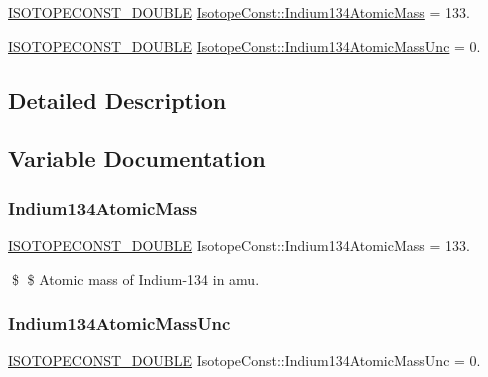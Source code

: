\begin{DoxyCompactItemize}
\item 
\mbox{\hyperlink{group___isotope_const-_macros_ga8f45a7272ce02c0b4c65c44636ed719a}{I\+S\+O\+T\+O\+P\+E\+C\+O\+N\+S\+T\+\_\+\+D\+O\+U\+B\+LE}} \mbox{\hyperlink{group___isotope_const-_indium-_in134_ga12067eb74c01ac14b3a024b5c6c214f1}{Isotope\+Const\+::\+Indium134\+Atomic\+Mass}} = 133.
\item 
\mbox{\hyperlink{group___isotope_const-_macros_ga8f45a7272ce02c0b4c65c44636ed719a}{I\+S\+O\+T\+O\+P\+E\+C\+O\+N\+S\+T\+\_\+\+D\+O\+U\+B\+LE}} \mbox{\hyperlink{group___isotope_const-_indium-_in134_ga6e541bd087b6133cbb0b04a75e677d3d}{Isotope\+Const\+::\+Indium134\+Atomic\+Mass\+Unc}} = 0.
\end{DoxyCompactItemize}


\subsection{Detailed Description}


\subsection{Variable Documentation}
\mbox{\label{group___isotope_const-_indium-_in134_ga12067eb74c01ac14b3a024b5c6c214f1}} 
\subsubsection{\texorpdfstring{Indium134\+Atomic\+Mass}{Indium134AtomicMass}}
{\footnotesize\ttfamily \mbox{\hyperlink{group___isotope_const-_macros_ga8f45a7272ce02c0b4c65c44636ed719a}{I\+S\+O\+T\+O\+P\+E\+C\+O\+N\+S\+T\+\_\+\+D\+O\+U\+B\+LE}} Isotope\+Const\+::\+Indium134\+Atomic\+Mass = 133.}

\$ \$ Atomic mass of Indium-\/134 in amu. \mbox{\label{group___isotope_const-_indium-_in134_ga6e541bd087b6133cbb0b04a75e677d3d}} 
\subsubsection{\texorpdfstring{Indium134\+Atomic\+Mass\+Unc}{Indium134AtomicMassUnc}}
{\footnotesize\ttfamily \mbox{\hyperlink{group___isotope_const-_macros_ga8f45a7272ce02c0b4c65c44636ed719a}{I\+S\+O\+T\+O\+P\+E\+C\+O\+N\+S\+T\+\_\+\+D\+O\+U\+B\+LE}} Isotope\+Const\+::\+Indium134\+Atomic\+Mass\+Unc = 0.}

